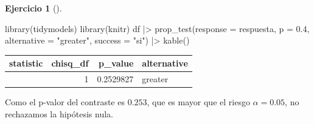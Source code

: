 \documentclass[
  a4paper,
]{scrreport}
\newenvironment{Shaded}{\begin{snugshade}}{\end{snugshade}}
\newcommand{\AttributeTok}[1]{\textcolor[rgb]{0.40,0.45,0.13}{#1}}
\newcommand{\FloatTok}[1]{\textcolor[rgb]{0.68,0.00,0.00}{#1}}
\newcommand{\FunctionTok}[1]{\textcolor[rgb]{0.28,0.35,0.67}{#1}}
\newcommand{\NormalTok}[1]{\textcolor[rgb]{0.00,0.23,0.31}{#1}}
\newcommand{\SpecialCharTok}[1]{\textcolor[rgb]{0.37,0.37,0.37}{#1}}
\newcommand{\StringTok}[1]{\textcolor[rgb]{0.13,0.47,0.30}{#1}}
\theoremstyle{definition}
\newtheorem{exercise}{Ejercicio}[chapter]
\theoremstyle{remark}
\begin{document}
\begin{exercise}[]
\begin{enumerate}
\begin{tcolorbox}
\begin{Shaded}
\begin{Highlighting}[]
\FunctionTok{library}\NormalTok{(tidymodels)}
\FunctionTok{library}\NormalTok{(knitr)}
\NormalTok{df  }\SpecialCharTok{|\textgreater{}} 
    \FunctionTok{prop\_test}\NormalTok{(}\AttributeTok{response =}\NormalTok{ respuesta, }\AttributeTok{p =} \FloatTok{0.4}\NormalTok{, }\AttributeTok{alternative =} \StringTok{"greater"}\NormalTok{, }\AttributeTok{success =} \StringTok{"si"}\NormalTok{) }\SpecialCharTok{|\textgreater{}}
    \FunctionTok{kable}\NormalTok{()}
\end{Highlighting}
\end{Shaded}

  \begin{longtable}[]{@{}rrrl@{}}
  \toprule\noalign{}
  statistic & chisq\_df & p\_value & alternative \\
  \midrule\noalign{}
  \endhead
  \bottomrule\noalign{}
  \endlastfoot
  0.442402 & 1 & 0.2529827 & greater \\
  \end{longtable}

  Como el p-valor del contraste es \(0.253\), que es mayor que el riesgo
  \(\alpha=0.05\), no rechazamos la hipótesis nula.

  \end{tcolorbox}
\end{enumerate}

\end{exercise}
\end{document}
